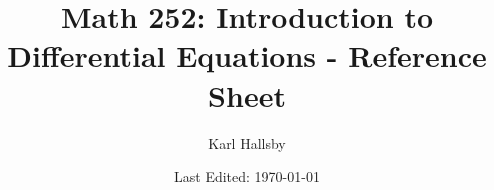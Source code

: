 




\begin{titlepage}
  \title{Math 252: Introduction to Differential Equations - Reference Sheet}
  \author{Karl Hallsby}
  \date{Last Edited: \today}
\end{titlepage}


\maketitle
{} %
\tableofcontents
\clearpage
{} %



\appendix
{}

\clearpage


\clearpage



